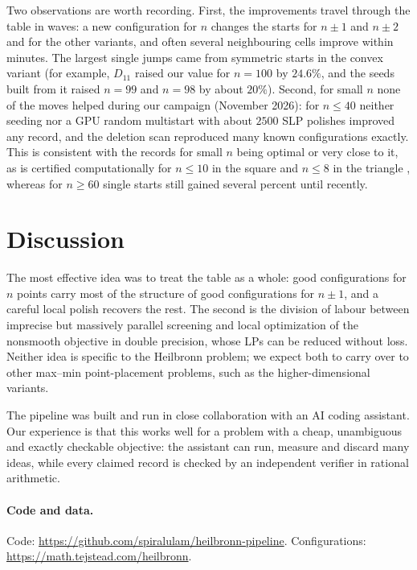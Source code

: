 \documentclass[11pt]{article}
\theoremstyle{remark}
\newcommand{\CodeURL}{\url{https://github.com/spiralulam/heilbronn-pipeline}}
\begin{document}
Two observations are worth recording. First, the improvements travel through the table in waves: a new configuration
for $n$ changes the starts for $n \pm 1$ and $n \pm 2$ and for the other variants, and often several neighbouring cells
improve within minutes. The largest single jumps came from symmetric starts in the convex variant (for example, $D_{11}$
raised our value for $n = 100$ by $24.6\%$, and the seeds built from it raised $n = 99$ and $n = 98$ by about $20\%$).
Second, for small $n$ none of the moves helped during our campaign (November 2026): for $n \le 40$ neither seeding nor a
GPU random multistart with about $2500$ SLP polishes improved any record, and the deletion scan reproduced many known
configurations exactly. This is consistent with the records for small $n$ being optimal or very close to it, as is
certified computationally for $n \le 10$ in the square and $n \le 8$ in the triangle \cite{SM26a,SM26b}, whereas for $n \ge 60$ single starts still
gained several percent until recently.

\section{Discussion}\label{sec:discussion}

The most effective idea was to treat the table as a whole: good configurations for $n$ points carry most of the
structure of good configurations for $n \pm 1$, and a careful local polish recovers the rest. The second is the division
of labour between imprecise but massively parallel screening and local optimization of the nonsmooth objective in
double precision, whose LPs can be reduced without loss. Neither idea is specific to the Heilbronn problem; we expect
both to carry over to other max--min point-placement problems, such as the higher-dimensional variants.

The pipeline was built and run in close collaboration with an AI coding assistant. Our experience is that this works
well for a problem with a cheap, unambiguous and exactly checkable objective: the assistant can run, measure and
discard many ideas, while every claimed record is checked by an independent verifier in rational arithmetic.

\paragraph{Code and data.} Code: \CodeURL{}. Configurations: \url{https://math.tejstead.com/heilbronn}.
\end{document}
